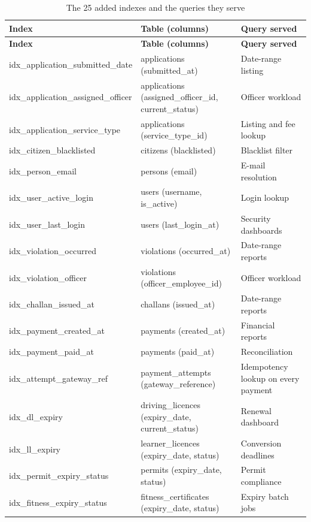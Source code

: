 \begingroup\footnotesize
\begin{longtable}{@{}p{4.6cm}p{4.6cm}p{5.4cm}@{}}
\caption{The 25 added indexes and the queries they serve}\label{tab:indexes}\\
\toprule \textbf{Index} & \textbf{Table (columns)} & \textbf{Query served}\\ \midrule \endfirsthead
\toprule \textbf{Index} & \textbf{Table (columns)} & \textbf{Query served}\\ \midrule \endhead
\bottomrule \endlastfoot
idx\_application\_submitted\_date & applications (submitted\_at) & Date-range listing\\
idx\_application\_assigned\_officer & applications (assigned\_officer\_id, current\_status) & Officer workload\\
idx\_application\_service\_type & applications (service\_type\_id) & Listing and fee lookup\\
idx\_citizen\_blacklisted & citizens (blacklisted) & Blacklist filter\\
idx\_person\_email & persons (email) & E-mail resolution\\
idx\_user\_active\_login & users (username, is\_active) & Login lookup\\
idx\_user\_last\_login & users (last\_login\_at) & Security dashboards\\
idx\_violation\_occurred & violations (occurred\_at) & Date-range reports\\
idx\_violation\_officer & violations (officer\_employee\_id) & Officer workload\\
idx\_challan\_issued\_at & challans (issued\_at) & Date-range reports\\
idx\_payment\_created\_at & payments (created\_at) & Financial reports\\
idx\_payment\_paid\_at & payments (paid\_at) & Reconciliation\\
idx\_attempt\_gateway\_ref & payment\_attempts (gateway\_reference) & Idempotency lookup on every payment\\
idx\_dl\_expiry & driving\_licences (expiry\_date, current\_status) & Renewal dashboard\\
idx\_ll\_expiry & learner\_licences (expiry\_date, status) & Conversion deadlines\\
idx\_permit\_expiry\_status & permits (expiry\_date, status) & Permit compliance\\
idx\_fitness\_expiry\_status & fitness\_certificates (expiry\_date, status) & Expiry batch jobs\\

\end{longtable}
